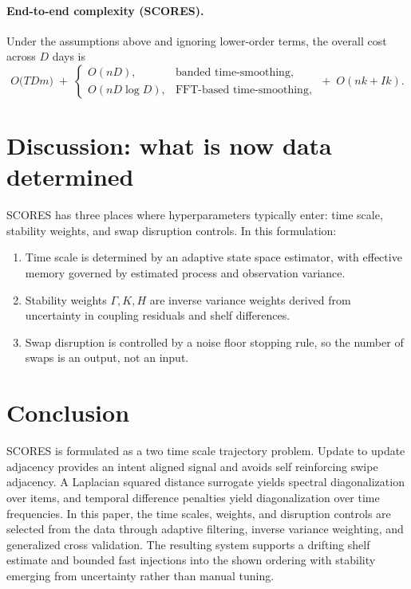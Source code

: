 \documentclass[11pt]{article}
\begin{document}
\paragraph{End-to-end complexity (SCORES).}
Under the assumptions above and ignoring lower-order terms, the overall cost across $D$ days is
\[
O\bigl(T D m\bigr)\;+\;
\begin{cases}
O(nD), & \text{banded time-smoothing},\\
O(nD\log D), & \text{FFT-based time-smoothing},
\end{cases}
\;+\; O(nk + I k).
\]

\section{Discussion: what is now data determined}
SCORES has three places where hyperparameters typically enter: time scale, stability weights, and swap disruption controls.
In this formulation:
\begin{enumerate}
\item Time scale is determined by an adaptive state space estimator, with effective memory governed by estimated process and observation variance.
\item Stability weights $\Gamma,K,H$ are inverse variance weights derived from uncertainty in coupling residuals and shelf differences.
\item Swap disruption is controlled by a noise floor stopping rule, so the number of swaps is an output, not an input.
\end{enumerate}

\section{Conclusion}
SCORES is formulated as a two time scale trajectory problem.
Update to update adjacency provides an intent aligned signal and avoids self reinforcing swipe adjacency.
A Laplacian squared distance surrogate yields spectral diagonalization over items, and temporal difference penalties yield diagonalization over time frequencies.
In this paper, the time scales, weights, and disruption controls are selected from the data through adaptive filtering, inverse variance weighting, and generalized cross validation.
The resulting system supports a drifting shelf estimate and bounded fast injections into the shown ordering with stability emerging from uncertainty rather than manual tuning.


\end{document}
